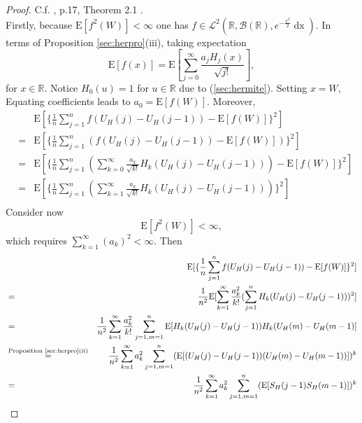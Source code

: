 \documentclass[a4paper, twoside, 11pt]{article}
\theoremstyle{definition}
\begin{document}
\begin{proof}
  C.f. \cite{nourdin}, p.17, Theorem 2.1 .\\
  Firstly, because $\mathrm{E}[f^2(W)] < \infty$ one has $f \in \mathcal{L}^2(\mathbb{R}, \mathscr{B}(\mathbb{R}), e^{-\frac{x^2}{2}}\mathop{dx})$. In terms of Proposition \ref{sec:herpro}(iii), taking expectation
 \begin{equation*}
	\mathrm{E}[f(x)] = \mathrm{E}[\sum\limits_{j=0}^{\infty} \frac{a_jH_j(x)}{\sqrt{j!}}], 
  \end{equation*}
  for $x \in \mathbb{R}$.
  Notice $H_0(u)=1$ for $u\in \mathbb{R}$ due to (\ref{sec:hermite}). Setting $x=W$, Equating coefficients leads to $a_0 = \mathrm{E}[f(W)]$. Moreover,
  \begin{eqnarray*}
	&& \mathrm{E}[\{\frac{1}{n}\sum\limits_{j=1}^n f(U_H(j) - U_H(j-1)) - \mathrm{E}[f(W)]\}^2]\\
	&=& \mathrm{E}[\{\frac{1}{n}\sum\limits_{j=1}^n (f(U_H(j) - U_H(j-1)) - \mathrm{E}[f(W)])\}^2] \\
	&=& \mathrm{E}[\{\frac{1}{n}\sum\limits_{j=1}^n (\sum\limits_{k=0}^\infty \frac{a_k}{\sqrt{k!}} H_k(U_H(j) - U_H(j-1))) - \mathrm{E}[f(W)]\}^2] \\
	&=& \mathrm{E}[\{\frac{1}{n}\sum\limits_{j=1}^n (\sum\limits_{k=1}^\infty \frac{a_k}{\sqrt{k!}} H_k(U_H(j) - U_H(j-1)))\}^2] \\
  \end{eqnarray*}
  Consider now 
  \begin{equation*}
	\mathrm{E}[f^2(W)] < \infty,
  \end{equation*}
  which requires $\sum\limits_{k=1}^\infty (a_k)^2 < \infty$. Then
  \begin{eqnarray*}
	&& \mathrm{E}[\{\frac{1}{n}\sum\limits_{j=1}^n f(U_H(j) - U_H(j-1)) - \mathrm{E}[f(W)]\}^2]\\
	&=& \frac{1}{n^2} \mathrm{E}[\sum\limits_{k=1}^\infty \frac{a_k^2}{k!}(\sum\limits_{j=1}^n H_k(U_H(j) - U_H(j-1)))^2] \\
	&=& \frac{1}{n^2} \sum\limits_{k=1}^\infty \frac{a_k^2}{k!}\sum\limits_{j=1, m=1}^n \mathrm{E}[H_k(U_H(j) - U_H(j-1))  H_k(U_H(m) - U_H(m-1)]\\
	&\overset{\text{Proposition \ref{sec:herpro}(ii)}}{=}&  \frac{1}{n^2} \sum\limits_{k=1}^\infty a_k^2\sum\limits_{j=1, m=1}^n (\mathrm{E}[(U_H(j) - U_H(j-1)) (U_H(m) - U_H(m-1))])^k \\
	&=& \frac{1}{n^2} \sum\limits_{k=1}^\infty a_k^2\sum\limits_{j=1, m=1}^n (\mathrm{E}[S_H(j-1) S_H(m-1)])^k\\

\end{eqnarray*}
\end{proof}
\end{document}
